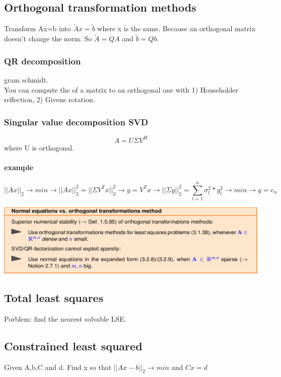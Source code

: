 \documentclass[12pt, a4paper]{article}
\begin{document}
\subsection{Orthogonal transformation methods}
Transform Ax=b into $\tilde{A}x=\tilde{b}$ where x is the same. Because an orthogonal matrix doesn't change the norm. So $\tilde{A}=QA$ and $\tilde{b} = Qb$.
\subsubsection{QR decomposition}
gram schmidt.\\
You can compute the of a matrix to an orthogonal one with 1) Householder reflection, 2) Givens rotation.
\subsubsection{Singular value decomposition SVD}
\begin{equation}
	A=U\Sigma V^H
\end{equation}
where U is orthogonal.
\paragraph{example}
\begin{equation}
	||Ax||_2\rightarrow min \rightarrow ||Ax||_2^2=||\Sigma V^Tx||_2^2 \rightarrow y=V^Tx \rightarrow ||\Sigma y||_2^2 = \sum_{l=1}^n\sigma_l^2*y_l^2\rightarrow min \rightarrow y = e_n
\end{equation}

\begin{center}
	 \includegraphics[width=1.0\textwidth]{norm_vs_orth.png}
\end{center}

\subsection{Total least squares}
Porblem: find the nearest solvable LSE.
\subsection{Constrained least squared}
Given A,b,C and d. Find x so that $||Ax-b||_2\rightarrow min$ and $Cx=d$
\end{document}
